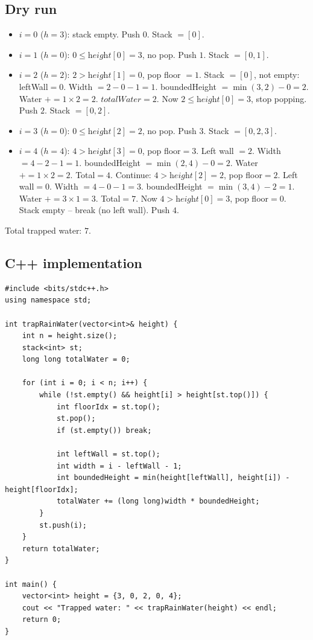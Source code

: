 \subsection*{Dry run}


\begin{itemize}
  \item $i=0$ ($h=3$): stack empty. Push $0$. Stack $=[0]$.
  \item $i=1$ ($h=0$): $0 \le \textit{height}[0]=3$, no pop. Push $1$.
        Stack $=[0,1]$.
  \item $i=2$ ($h=2$): $2 > \textit{height}[1]=0$, pop floor $=1$. Stack
        $=[0]$, not empty: leftWall$=0$. Width $=2-0-1=1$.
        boundedHeight $=\min(3,2)-0=2$. Water $+=1\times2=2$.
        $\textit{totalWater}=2$. Now $2 \le \textit{height}[0]=3$, stop
        popping. Push $2$. Stack $=[0,2]$.
  \item $i=3$ ($h=0$): $0\le \textit{height}[2]=2$, no pop. Push $3$.
        Stack $=[0,2,3]$.
  \item $i=4$ ($h=4$): $4>\textit{height}[3]=0$, pop floor$=3$. Left
        wall $=2$. Width $=4-2-1=1$. boundedHeight
        $=\min(2,4)-0=2$. Water $+=1\times2=2$. Total$=4$. Continue:
        $4>\textit{height}[2]=2$, pop floor$=2$. Left wall$=0$. Width
        $=4-0-1=3$. boundedHeight $=\min(3,4)-2=1$. Water
        $+=3\times1=3$. Total$=7$. Now $4>\textit{height}[0]=3$, pop
        floor$=0$. Stack empty -- break (no left wall). Push $4$.
\end{itemize}

Total trapped water: $7$.

\subsection*{C++ implementation}

\begin{lstlisting}
#include <bits/stdc++.h>
using namespace std;

int trapRainWater(vector<int>& height) {
    int n = height.size();
    stack<int> st;
    long long totalWater = 0;

    for (int i = 0; i < n; i++) {
        while (!st.empty() && height[i] > height[st.top()]) {
            int floorIdx = st.top();
            st.pop();
            if (st.empty()) break;

            int leftWall = st.top();
            int width = i - leftWall - 1;
            int boundedHeight = min(height[leftWall], height[i]) - height[floorIdx];
            totalWater += (long long)width * boundedHeight;
        }
        st.push(i);
    }
    return totalWater;
}

int main() {
    vector<int> height = {3, 0, 2, 0, 4};
    cout << "Trapped water: " << trapRainWater(height) << endl;
    return 0;
}
\end{lstlisting}


